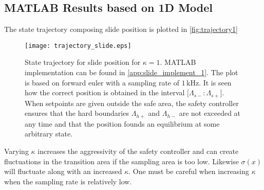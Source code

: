 \subsection{MATLAB Results based on 1D Model}
The state trajectory composing slide position is plotted in \autoref{fig:trajectory1}
\begin{figure}[H]
	\center
		\texttt{[image: trajectory\_slide.eps]}
	\caption{State trajectory for slide position for $\kappa=1$. MATLAB implementation can be found in \autoref{app:slide_implement_1}. The plot is based on forward euler with a sampling rate of $1\,$kHz. It is seen how the correct position is obtained in the interval $[\Lambda_{s-}:\Lambda_{s+}$]. When setpoints are given outside the safe area, the safety controller ensures that the hard boundaries $\Lambda_{h+}$ and $\Lambda_{h-}$ are not exceeded at any time and that the position founds an equilibrium at some arbitrary state.}
	\label{fig:trajectory1}
\end{figure}
Varying $\kappa$ increases the aggressivity of the safety controller and can create fluctuations in the transition area if the sampling area is too low. Likewise $\sigma(x)$ will fluctuate along with an increased $\kappa$. One must be careful when increasing $\kappa$ when the sampling rate is relatively low. %

